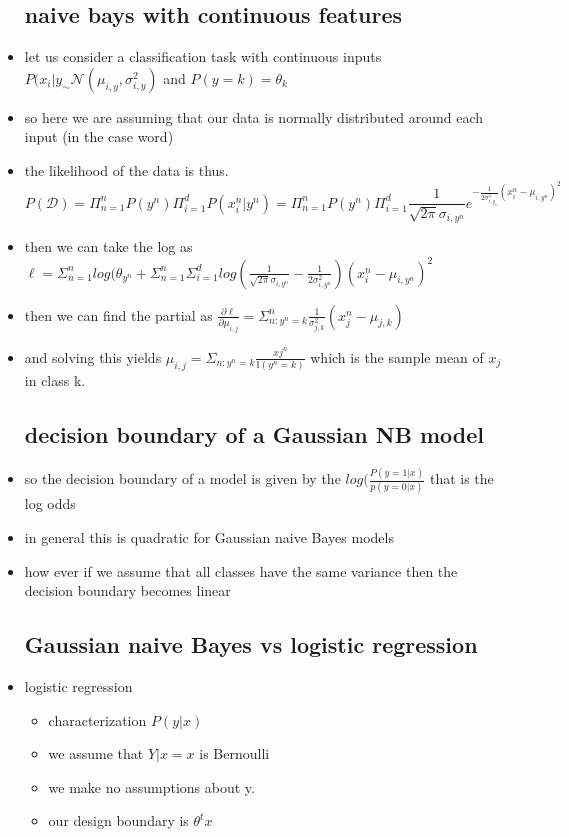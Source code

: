\documentclass{article}
\begin{document}
\begin{itemize}
\begin{itemize}
\end{itemize}
\subsection{naive bays with continuous features}
\item let us consider a classification task with continuous inputs $P(x_i|y_\sim \mathcal{N}(\mu_{i,y},\sigma^2_{i,y})$ and $P(y=k)=\theta_k$
\item so here we are assuming that our data is normally distributed around each input (in the case word) 
\item the likelihood of the data is thus. $$P(\mathcal{D})=\Pi_{n=1}^nP(y^n)\Pi_{i=1}^{d}P(x_i^n|y^n)=\Pi_{n=1}^nP(y^n)\Pi_{i=1}^{d}\frac{1}{\sqrt{2\pi}\sigma_{i,y^n}}e^{-\frac{1}{2\sigma_{i,y_n}^2}(x_i^n-\mu_{i,y^n})^2}$$
\item then we can take the log as $\ell=\Sigma_{n=1}^{n}log(\theta_{y^n}+\Sigma_{n=1}^n\Sigma_{i=1}^{d}log(\frac{1}{\sqrt{2\pi}\sigma_{i,y^n}}-\frac{1}{2\sigma^2_{i,y^n}})(x_i^n-\mu_{i,y^n})^2$
\item then we can find the partial as $\frac{\partial \ell}{\partial \mu_{i,j}}=\Sigma_{n:y^n=k}^{n}\frac{1}{\sigma_{j,k}^2}(x_j^n-\mu_{j,k})$
\item and solving this yields $\mu_{i,j}=\Sigma_{n:y^n=k}\frac{xj^n}{\mathbb{I}(y^n=k)}$ which is the sample mean of $x_j$ in class k. 
\subsection{decision boundary of a Gaussian NB model}
\item so the decision boundary of a model is given by the $log(\frac{P(y=1|x)}{p(y=0|x)}$ that is the log odds
\item in general this is quadratic for Gaussian naive Bayes models 
\item how ever if we assume that all classes have the same variance then the decision boundary becomes linear 
\subsection{Gaussian naive Bayes vs logistic regression}
\item logistic regression
\begin{itemize}
    
\itme modal type: conditional
\item characterization $P(y|x)$
\item we assume that $Y|x=x$ is Bernoulli
\item we make no assumptions about y. 
\item our design boundary is $\theta^tx$
\end{itemize}



\end{itemize}
\end{document}
